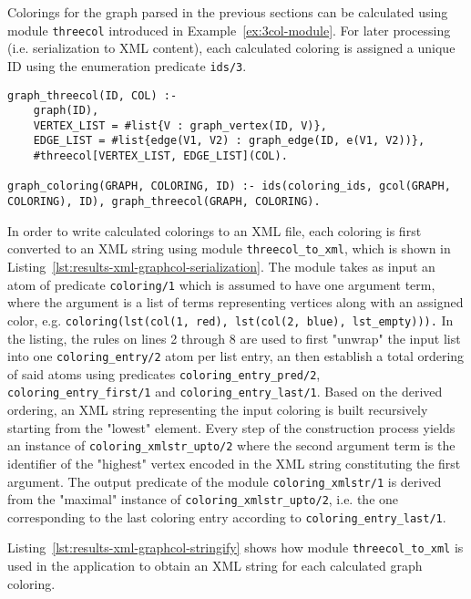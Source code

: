 Colorings for the graph parsed in the previous sections can be calculated using module \texttt{threecol} introduced in Example~\ref{ex:3col-module}. For later processing (i.e. serialization to XML content), each calculated coloring is assigned a unique ID using the enumeration predicate \texttt{ids/3}.

\begin{lstlisting}[style=asp-code, label={lst:results-xml-graphcol-colorings}, caption={Calculating graph colorings.}]
graph_threecol(ID, COL) :- 
	graph(ID), 
	VERTEX_LIST = #list{V : graph_vertex(ID, V)}, 
	EDGE_LIST = #list{edge(V1, V2) : graph_edge(ID, e(V1, V2))}, 
	#threecol[VERTEX_LIST, EDGE_LIST](COL).

graph_coloring(GRAPH, COLORING, ID) :- ids(coloring_ids, gcol(GRAPH, COLORING), ID), graph_threecol(GRAPH, COLORING).    
\end{lstlisting}    

In order to write calculated colorings to an XML file, each coloring is first converted to an XML string using module \texttt{threecol\_to\_xml}, which is shown in Listing~\ref{lst:results-xml-graphcol-serialization}. The module takes as input an atom of predicate \texttt{coloring/1} which is assumed to have one argument term, where the argument is a list of terms representing vertices along with an assigned color, e.g. \texttt{coloring(lst(col(1, red), lst(col(2, blue), lst\_empty))).}
In the listing, the rules on lines 2 through 8 are used to first "unwrap" the input list into one \texttt{coloring\_entry/2} atom per list entry, an then establish a total ordering of said atoms using predicates \texttt{coloring\_entry\_pred/2}, \texttt{coloring\_entry\_first/1} and \texttt{coloring\_entry\_last/1}. Based on the derived ordering, an XML string representing the input coloring is built recursively starting from the "lowest" element. Every step of the construction process yields an instance of \texttt{coloring\_xmlstr\_upto/2} where the second argument term is the identifier of the "highest" vertex encoded in the XML string constituting the first argument. The output predicate of the module \texttt{coloring\_xmlstr/1} is derived from the "maximal" instance of \texttt{coloring\_xmlstr\_upto/2}, i.e. the one corresponding to the last coloring entry according to \texttt{coloring\_entry\_last/1}.

Listing~\ref{lst:results-xml-graphcol-stringify} shows how module \texttt{threecol\_to\_xml} is used in the application to obtain an XML string for each calculated graph coloring.

